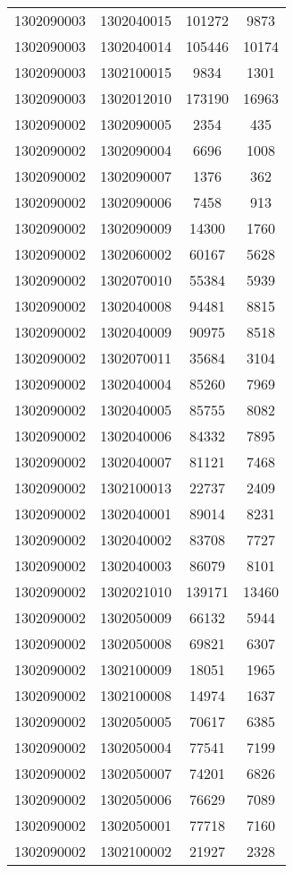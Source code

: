 \begin{longtable}{llcc}
1302090003 & 1302040015 & 101272 & 9873\\
1302090003 & 1302040014 & 105446 & 10174\\
1302090003 & 1302100015 & 9834 & 1301\\
1302090003 & 1302012010 & 173190 & 16963\\
1302090002 & 1302090005 & 2354 & 435\\
1302090002 & 1302090004 & 6696 & 1008\\
1302090002 & 1302090007 & 1376 & 362\\
1302090002 & 1302090006 & 7458 & 913\\
1302090002 & 1302090009 & 14300 & 1760\\
1302090002 & 1302060002 & 60167 & 5628\\
1302090002 & 1302070010 & 55384 & 5939\\
1302090002 & 1302040008 & 94481 & 8815\\
1302090002 & 1302040009 & 90975 & 8518\\
1302090002 & 1302070011 & 35684 & 3104\\
1302090002 & 1302040004 & 85260 & 7969\\
1302090002 & 1302040005 & 85755 & 8082\\
1302090002 & 1302040006 & 84332 & 7895\\
1302090002 & 1302040007 & 81121 & 7468\\
1302090002 & 1302100013 & 22737 & 2409\\
1302090002 & 1302040001 & 89014 & 8231\\
1302090002 & 1302040002 & 83708 & 7727\\
1302090002 & 1302040003 & 86079 & 8101\\
1302090002 & 1302021010 & 139171 & 13460\\
1302090002 & 1302050009 & 66132 & 5944\\
1302090002 & 1302050008 & 69821 & 6307\\
1302090002 & 1302100009 & 18051 & 1965\\
1302090002 & 1302100008 & 14974 & 1637\\
1302090002 & 1302050005 & 70617 & 6385\\
1302090002 & 1302050004 & 77541 & 7199\\
1302090002 & 1302050007 & 74201 & 6826\\
1302090002 & 1302050006 & 76629 & 7089\\
1302090002 & 1302050001 & 77718 & 7160\\
1302090002 & 1302100002 & 21927 & 2328\\

\end{longtable}

